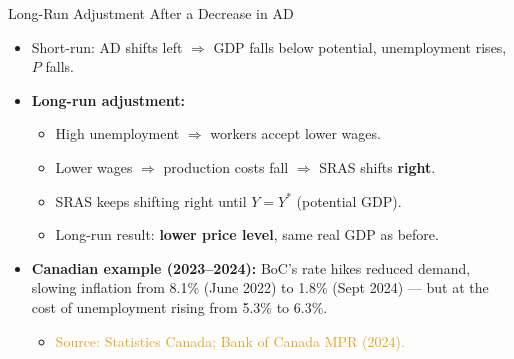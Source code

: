 \documentclass[aspectratio=169]{beamer}
\begin{document}
\begin{frame}{Long-Run Adjustment After a Decrease in AD}
\transfade
\begin{itemize}[<+->]
  \item Short-run: AD shifts left $\Rightarrow$ GDP falls below potential, unemployment rises, $P$ falls.
  \item \textbf{Long-run adjustment:}
  \begin{itemize}[<+->]
    \item High unemployment $\Rightarrow$ workers accept lower wages.
    \item Lower wages $\Rightarrow$ production costs fall $\Rightarrow$ SRAS shifts \textbf{right}.
    \item SRAS keeps shifting right until $Y = Y^*$ (potential GDP).
    \item Long-run result: \textbf{lower price level}, same real GDP as before.
  \end{itemize}
  \item \textbf{Canadian example (2023--2024):} BoC's rate hikes reduced demand, slowing inflation from 8.1\% (June 2022) to \alert{1.8\%} (Sept 2024) --- but at the cost of unemployment rising from 5.3\% to 6.3\%.
  \begin{itemize}[<+->]
    \item \textcolor{goldenrod}{Source: Statistics Canada; Bank of Canada MPR (2024).}
  \end{itemize}
\end{itemize}
\end{frame}
\end{document}
